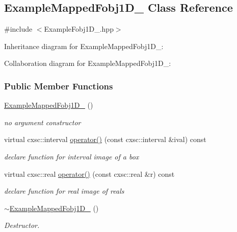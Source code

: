 \hypertarget{classExampleMappedFobj1D__2}{\subsection{\-Example\-Mapped\-Fobj1\-D\-\_ \-Class \-Reference}
\label{classExampleMappedFobj1D__2}
}


{\ttfamily \#include $<$\-Example\-Fobj1\-D\-\_.\-hpp$>$}



\-Inheritance diagram for \-Example\-Mapped\-Fobj1\-D\-\_\-:


\-Collaboration diagram for \-Example\-Mapped\-Fobj1\-D\-\_\-:
\subsubsection*{\-Public \-Member \-Functions}
\begin{DoxyCompactItemize}
\item 
\hyperlink{classExampleMappedFobj1D__2_adffdbb306bc0ebbe1ed3c76da233fdf2}{\-Example\-Mapped\-Fobj1\-D\-\_} ()
\begin{DoxyCompactList}\small\item\em no argument constructor \end{DoxyCompactList}\item 
virtual cxsc\-::interval \hyperlink{classExampleMappedFobj1D__2_a14732de9fe59eb1b1133194b8de85c6c}{operator()} (const cxsc\-::interval \&ival) const 
\begin{DoxyCompactList}\small\item\em declare function for interval image of a box \end{DoxyCompactList}\item 
virtual cxsc\-::real \hyperlink{classExampleMappedFobj1D__2_adc6b1597bdb736bfc250f5353a8cc059}{operator()} (const cxsc\-::real \&r) const 
\begin{DoxyCompactList}\small\item\em declare function for real image of reals \end{DoxyCompactList}\item 
\hyperlink{classExampleMappedFobj1D__2_a71c7c187d8676a92bf17817a98277fa4}{$\sim$\-Example\-Mapped\-Fobj1\-D\-\_} ()
\begin{DoxyCompactList}\small\item\em \-Destructor. \end{DoxyCompactList}\end{DoxyCompactItemize}



